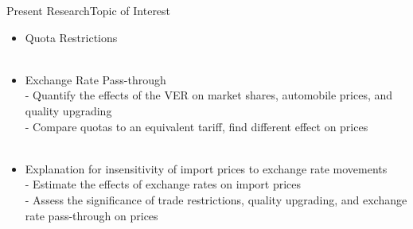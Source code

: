 \documentclass{beamer}
\begin{document}
\begin{frame}{Present Research}{Topic of Interest}
\begin{itemize}
	\item Quota Restrictions \\~\\
	\item Exchange Rate Pass-through \\
	- Quantify the effects of the VER on market shares, automobile prices, and quality upgrading \\
	- Compare quotas to an equivalent tariff, find different effect on prices  \\~\\
	\item Explanation for insensitivity of import prices to exchange rate movements \\
	- Estimate the effects of exchange rates on import prices \\
	- Assess the significance of trade restrictions, quality upgrading, and exchange rate pass-through on prices 
\end{itemize}
\end{frame}
\end{document}
